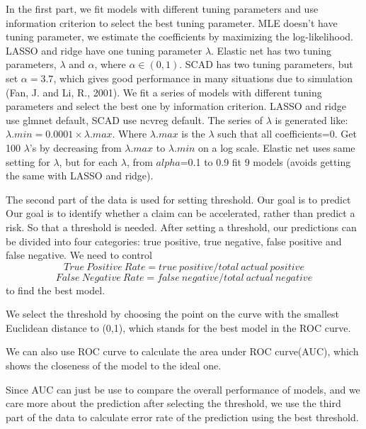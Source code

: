 \documentclass[paper=a4, fontsize=11pt]{scrartcl} %
\numberwithin{equation}{section} %
\numberwithin{figure}{section} %
\numberwithin{table}{section} %
\begin{document}
In the first part, we fit models with different tuning parameters and use information criterion to select the best tuning parameter. 
MLE doesn't have tuning parameter, we estimate the coefficients by maximizing the log-likelihood.
LASSO and ridge have one tuning parameter $\lambda$.
Elastic net has two tuning parameters, $\lambda$ and $\alpha$, where $\alpha\in(0,1) $. 
SCAD has two tuning parameters, but set $\alpha=3.7$, which gives good performance in many situations due to simulation (Fan, J. and Li, R., 2001).
We fit a series of models with different tuning parameters and select the best one by information criterion. LASSO and ridge use glmnet default, SCAD use ncvreg default. The series of $\lambda$ is generated like:
$\lambda .min=0.0001\times\lambda .max$. Where $\lambda .max$ is the $\lambda$ such that all coefficients=0. 
Get 100 $\lambda$'s by decreasing from $\lambda .max$ to $\lambda .min$ on a log scale.
Elastic net uses same setting for $\lambda$, but for each $\lambda$, from $alpha$=0.1 to 0.9 fit 9 models (avoids getting the same with LASSO and ridge).  
\\\par
The second part of the data is used for setting threshold. Our goal is to predict 
Our goal is to identify whether a claim can be accelerated, rather than predict a risk.
So that a threshold is needed. After setting a threshold, our predictions can be divided into four categories: true positive, true negative, false positive and false negative.
We need to control  
\begin{equation}
True\ Positive\ Rate=true\ positive/total\ actual\ positive
\end{equation}
\begin{equation}
False\ Negative\ Rate=false\ negative/total\ actual\ negative
\end{equation}
to find the best model.\par
We select the threshold by choosing the point on the curve with the smallest Euclidean distance to (0,1), which stands for the best model in the ROC curve. 

We can also use ROC curve to calculate the area under ROC curve(AUC), which shows the closeness of the model to the ideal one.
\\ \par
Since AUC can just be use to compare the overall performance of models, and we care more about the prediction after selecting the threshold, we use the third part of the data to calculate error rate of the prediction using the best threshold. 
\end{document}
